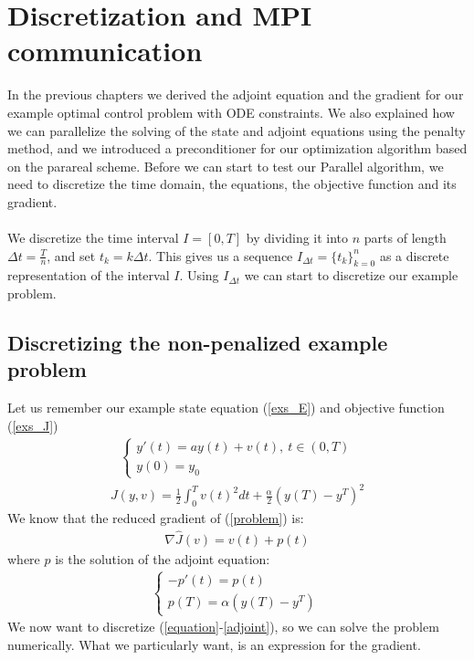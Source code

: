 \chapter{Discretization and MPI communication} \label{disc_chap}
In the previous chapters we derived the adjoint equation and the gradient for our example optimal control problem with ODE constraints. We also explained how we can parallelize the solving of the state and adjoint equations using the penalty method, and we introduced a preconditioner for our optimization algorithm based on the parareal scheme. Before we can start to test our Parallel algorithm, we need to discretize the time domain, the equations, the objective function and its gradient. 
\\
\\
We discretize the time interval $I=[0,T]$ by dividing it into $n$ parts of length $\Delta t=\frac{T}{n}$, and set $t_k=k\Delta t$. This gives us a sequence $I_{\Delta t}=\{t_k\}_{k=0}^{n}$ as a discrete representation of the interval $I$. Using $I_{\Delta t}$ we can start to discretize our example problem.
\section{Discretizing the non-penalized example problem} \label{DiscGradSec1}
Let us remember our example state equation (\ref{exs_E}) and objective function (\ref{exs_J}) 
\begin{align}
\left\{
     \begin{array}{lr}
       	y'(t)=a y(t) +v(t), \ t \in (0,T)\\
       	   y(0)=y_0
     \end{array}
   \right. \label{equation}
\end{align}
\begin{align}
J(y,v) = \frac{1}{2}\int_0^Tv(t)^2dt + \frac{\alpha}{2}(y(T)-y^T)^2
\label{problem}
\end{align}
We know that the reduced gradient of (\ref{problem}) is:
\begin{align}
\nabla\hat{J}(v) = v(t)+p(t) \label{gradiant}
\end{align}
where $p$ is the solution of the adjoint equation:
\begin{align}   
  \left\{
     \begin{array}{lr}
	-p'(t) = p(t) \\
	p(T) = \alpha( y(T)-y^T)     \
	\end{array}
   \right. \label{adjoint}
\end{align}
We now want to discretize (\ref{equation}-\ref{adjoint}), so we can solve the problem numerically. What we particularly want, is an expression for the gradient. 
